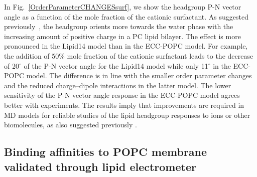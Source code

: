 \documentclass[aip,jcp,twocolumn]{revtex4}
\begin{document}
In Fig.~\ref{OrderParameterCHANGESsurf}, we show the headgroup P-N vector angle as a function of the mole fraction of the cationic surfactant. As suggested previously~\cite{seelig87}, the headgroup orients more towards the water phase with the increasing amount of positive charge in a PC lipid bilayer. The effect is more pronounced in the Lipid14 model than in the ECC-POPC model.   For example, the addition of 50\% mole fraction of the cationic surfactant leads to the decrease of 20$^{\circ}$ of the P-N vector angle for the Lipid14 model while only 11$^{\circ}$ in the ECC-POPC model. The difference is in line with the smaller order parameter changes and the reduced charge--dipole interactions in the latter model. The lower sensitivity of the P-N vector angle response in the ECC-POPC model agrees better with experiments. The results imply that improvements are required in MD models for reliable studies of the lipid headgroup responses to ions or other biomolecules{\color{red}, as also suggested previously \cite{botan15}} .


%
%


\subsection{Binding affinities to POPC membrane validated through lipid electrometer}
\end{document}
